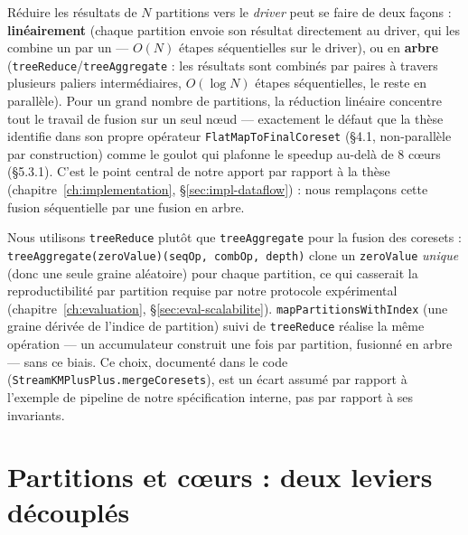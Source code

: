 Réduire les résultats de $N$ partitions vers le \emph{driver} peut se faire
de deux façons : \textbf{linéairement} (chaque partition envoie son résultat
directement au driver, qui les combine un par un --- $O(N)$ étapes
séquentielles sur le driver), ou en \textbf{arbre}
(\texttt{treeReduce}/\texttt{treeAggregate} : les résultats sont combinés
par paires à travers plusieurs paliers intermédiaires, $O(\log N)$ étapes
séquentielles, le reste en parallèle). Pour un grand nombre de partitions, la
réduction linéaire concentre tout le travail de fusion sur un seul n\oe{}ud ---
exactement le défaut que la thèse identifie dans son propre opérateur
\texttt{FlatMapToFinalCoreset} (§4.1, non-parallèle par construction) comme
le goulot qui plafonne le speedup au-delà de 8 c\oe{}urs (§5.3.1). C'est le point
central de notre apport par rapport à la thèse
(chapitre~\ref{ch:implementation}, §\ref{sec:impl-dataflow}) : nous
remplaçons cette fusion séquentielle par une fusion en arbre.

Nous utilisons \texttt{treeReduce} plutôt que \texttt{treeAggregate} pour la
fusion des coresets : \texttt{treeAggregate(zeroValue)(seqOp, combOp, depth)}
clone un \texttt{zeroValue} \emph{unique} (donc une seule graine aléatoire)
pour chaque partition, ce qui casserait la reproductibilité par partition
requise par notre protocole expérimental (chapitre~\ref{ch:evaluation},
§\ref{sec:eval-scalabilite}). \texttt{mapPartitionsWithIndex} (une graine
dérivée de l'indice de partition) suivi de \texttt{treeReduce} réalise la
même opération --- un accumulateur construit une fois par partition, fusionné
en arbre --- sans ce biais. Ce choix, documenté dans le code
(\texttt{StreamKMPlusPlus.mergeCoresets}), est un écart assumé par rapport à
l'exemple de pipeline de notre spécification interne, pas par rapport à ses
invariants.

\section{Partitions et c\oe{}urs : deux leviers découplés}
\label{sec:spark-partitions-coeurs}

